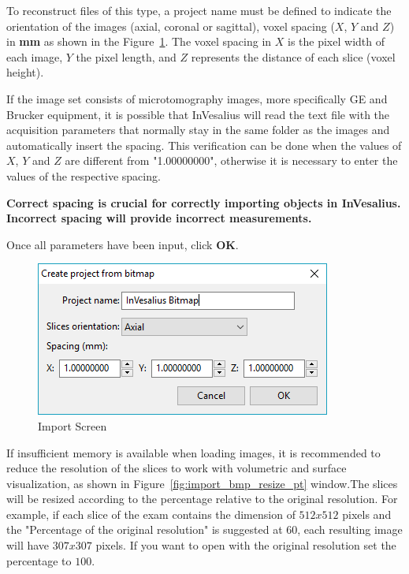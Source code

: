 To reconstruct files of this type, a project name must be defined to indicate the orientation of the images (axial, coronal or sagittal), voxel spacing ($X$, $Y$ and $Z$) in \textbf{mm} as shown in the Figure~\ref{fig:import_bmp_spacing_pt}. The voxel spacing in $X$ is the pixel width of each image, $Y$ the pixel length, and $Z$ represents the distance of each slice (voxel height).

If the image set consists of microtomography images, more specifically GE and Brucker equipment, it is possible that InVesalius will read the text file with the acquisition parameters that normally stay in the same folder as the images and automatically insert the spacing. This verification can be done when the values of $X$, $Y$ and $Z$ are different from "1.00000000", otherwise it is necessary to enter the values of the respective spacing.

\textbf{Correct spacing is crucial for correctly importing objects in InVesalius. Incorrect spacing will provide incorrect measurements.}

Once all parameters have been input, click \textbf{OK}.

\begin{figure}[!htb]
\centering
\includegraphics[scale=0.5]{../user_guide_figures/invesalius_screen/import_bmp_spacing_en.png}
\caption{Import Screen}
\label{fig:import_bmp_spacing_pt}
\end{figure}

If insufficient memory is available when loading images, it is recommended to reduce the resolution of the slices to work with volumetric and surface visualization, as shown in Figure~\ref{fig:import_bmp_resize_pt} window.The slices will be resized according to the percentage relative to the original resolution. For example, if each slice of the exam contains the dimension of $512 x 512$ pixels and the "Percentage of the original resolution" is suggested at 60, each resulting image will have $307 x 307$ pixels. If you want to open with the original resolution set the percentage to $100$.


